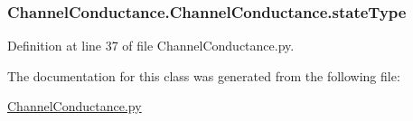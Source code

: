 \hypertarget{class_channel_conductance_1_1_channel_conductance_aa3c889bb4528c3abe7b69862cf87119d}{
\subsubsection[{state\-Type}]{\setlength{\rightskip}{0pt plus 5cm}Channel\-Conductance.\-Channel\-Conductance.\-state\-Type}}\label{class_channel_conductance_1_1_channel_conductance_aa3c889bb4528c3abe7b69862cf87119d}


Definition at line 37 of file Channel\-Conductance.\-py.



The documentation for this class was generated from the following file\-:\begin{DoxyCompactItemize}
\item 
\hyperlink{_channel_conductance_8py}{Channel\-Conductance.\-py}\end{DoxyCompactItemize}
